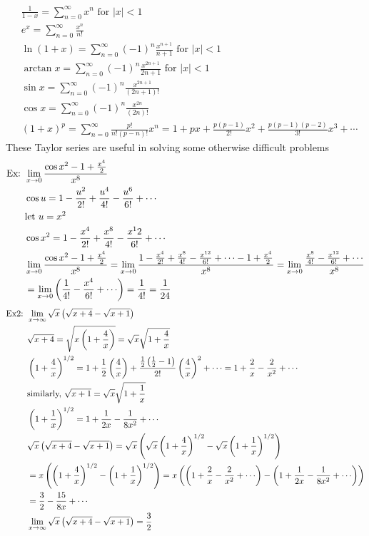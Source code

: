 \documentclass[11pt, fleqn]{article}
\begin{document}
\begin{align*}
    &\frac{1}{1-x}=\sum_{n=0}^\infty x^n\text{ for $|x|<1$}\\
    &e^x=\sum_{n=0}^\infty\frac{x^n}{n!}\\
    &\ln(1+x)=\sum_{n=0}^\infty(-1)^n\frac{x^{n+1}}{n+1}\text{ for $|x|<1$}\\
    &\arctan x=\sum_{n=0}^\infty(-1)^n\frac{x^{2n+1}}{2n+1}\text{ for $|x|<1$}\\
    &\sin x=\sum_{n=0}^\infty(-1)^n\frac{x^{2n+1}}{(2n+1)!}\\
    &\cos x=\sum_{n=0}^\infty(-1)^n\frac{x^{2n}}{(2n)!}\\
    &(1+x)^p=\sum_{n=0}^\infty\frac{p!}{n!(p-n)!}x^n=1+px+\frac{p(p-1)}{2!}x^2+\frac{p(p-1)(p-2)}{3!}x^3+\cdots
\end{align*}
These Taylor series are useful in solving some otherwise difficult problems
\begin{align*}
    \text{Ex: }&\lim_{x\to0}\frac{\cos x^2-1+\frac{x^4}{2}}{x^8}\\
    &\cos u=1-\frac{u^2}{2!}+\frac{u^4}{4!}-\frac{u^6}{6!}+\cdots\\
    &\text{let }u=x^2\\
    &\cos x^2=1-\frac{x^4}{2!}+\frac{x^8}{4!}-\frac{x^12}{6!}+\cdots\\
    &\lim_{x\to0}\frac{\cos x^2-1+\frac{x^4}{2}}{x^8}=\lim_{x\to0}\frac{1-\frac{x^4}{2!}+\frac{x^8}{4!}-\frac{x^{12}}{6!}+\cdots-1+\frac{x^4}{2}}{x^8}=\lim_{x\to0}\frac{\frac{x^8}{4!}-\frac{x^{12}}{6!}+\cdots}{x^8}\\
    &=\lim_{x\to0}\brround{\frac{1}{4!}-\frac{x^4}{6!}+\cdots}=\frac{1}{4!}=\frac{1}{24}
\end{align*}
\begin{align*}
    \text{Ex2: }&\lim_{x\to\infty}\sqrt{x}\brround{\sqrt{x+4}-\sqrt{x+1}}\\
    &\sqrt{x+4}=\sqrt{x\brround{1+\frac{4}{x}}}=\sqrt{x}\sqrt{1+\frac{4}{x}}\\
    &\brround{1+\frac{4}{x}}^{1/2}=1+\frac{1}{2}\brround{\frac{4}{x}}+\frac{\frac{1}{2}\brround{\frac{1}{2}-1}}{2!}\brround{\frac{4}{x}}^2+\cdots=1+\frac{2}{x}-\frac{2}{x^2}+\cdots\\
    &\text{similarly, }\sqrt{x+1}=\sqrt{x}\sqrt{1+\frac{1}{x}}\\
    &\brround{1+\frac{1}{x}}^{1/2}=1+\frac{1}{2x}-\frac{1}{8x^2}+\cdots\\
    &\sqrt{x}\brround{\sqrt{x+4}-\sqrt{x+1}}=\sqrt{x}\brround{\sqrt{x}\brround{1+\frac{4}{x}}^{1/2}-\sqrt{x}\brround{1+\frac{1}{x}}^{1/2}}\\
    &=x\brround{\brround{1+\frac{4}{x}}^{1/2}-\brround{1+\frac{1}{x}}^{1/2}}=x\brround{\brround{1+\frac{2}{x}-\frac{2}{x^2}+\cdots}-\brround{1+\frac{1}{2x}-\frac{1}{8x^2}+\cdots}}\\&=\frac{3}{2}-\frac{15}{8x}+\cdots\\
    &\lim_{x\to\infty}\sqrt{x}\brround{\sqrt{x+4}-\sqrt{x+1}}=\frac{3}{2}
\end{align*}
\end{document}

